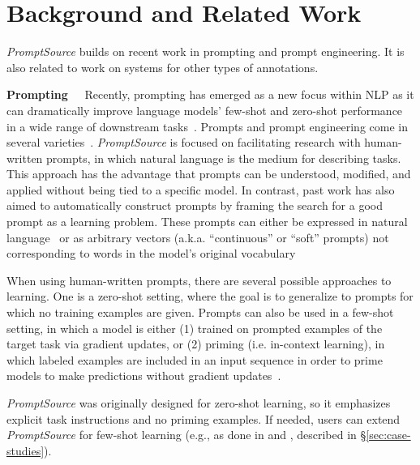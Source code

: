 \section{Background and Related Work} \label{sec:related-work}

\textit{PromptSource} builds on recent work in prompting and prompt engineering. It is also related to work on systems for other types of annotations.

 {\bf Prompting~~} Recently, prompting has emerged as a new focus within NLP as it can dramatically improve language models' few-shot and zero-shot performance in a wide range of downstream tasks~\citep{brown2020gpt3,timo:eacl2021,sanh2021multitask,wei2021flan}. Prompts and prompt engineering come in several varieties~\citep{liu:corr2021}.
\textit{PromptSource} is focused on facilitating research with human-written prompts, in which natural language is the medium for describing tasks. This approach has the advantage that prompts can be understood, modified, and applied without being tied to a specific model. In contrast, past work has also aimed to automatically construct prompts by framing the search for a good prompt as a learning problem. These prompts can either be expressed in natural language~\citep{gao-etal-2021-making,shin-etal-2020-autoprompt} or as arbitrary vectors (a.k.a. “continuous” or “soft” prompts) not corresponding to words in the model's original vocabulary~\citep{lester-etal-2021-power,qin-eisner-2021-learning}

When using human-written prompts, there are several possible approaches to learning. One is a zero-shot setting, where the goal is to generalize to prompts for which no training examples are given. Prompts can also be used in a few-shot setting, in which a model is either (1) trained on prompted examples of the target task via gradient updates, or (2) priming (i.e. in-context learning), in which labeled examples are included in an input sequence in order to prime models to make predictions without gradient updates~\citep{brown2020gpt3}. 

\textit{PromptSource} was originally designed for zero-shot learning, so it emphasizes explicit task instructions and no priming examples. If needed, users can extend \textit{PromptSource} for few-shot learning (e.g., as done in \citealp{lin2021multilingual} and \citealp{metaicl}, described in \S\ref{sec:case-studies}).

